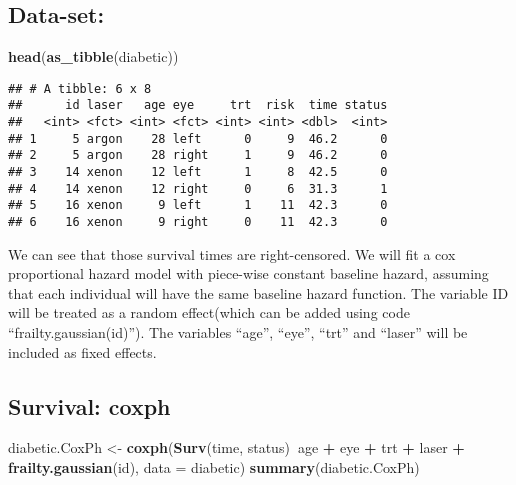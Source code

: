 \documentclass[]{article}
\newenvironment{Shaded}{\begin{snugshade}}{\end{snugshade}}
\newcommand{\DataTypeTok}[1]{\textcolor[rgb]{0.13,0.29,0.53}{#1}}
\newcommand{\KeywordTok}[1]{\textcolor[rgb]{0.13,0.29,0.53}{\textbf{#1}}}
\newcommand{\NormalTok}[1]{#1}
\newcommand{\OperatorTok}[1]{\textcolor[rgb]{0.81,0.36,0.00}{\textbf{#1}}}
\newcommand{\StringTok}[1]{\textcolor[rgb]{0.31,0.60,0.02}{#1}}
\begin{document}
\hypertarget{data-set}{%
\subsection{Data-set:}\label{data-set}}

\begin{Shaded}
\begin{Highlighting}[]
\KeywordTok{head}\NormalTok{(}\KeywordTok{as_tibble}\NormalTok{(diabetic))}
\end{Highlighting}
\end{Shaded}

\begin{verbatim}
## # A tibble: 6 x 8
##      id laser   age eye     trt  risk  time status
##   <int> <fct> <int> <fct> <int> <int> <dbl>  <int>
## 1     5 argon    28 left      0     9  46.2      0
## 2     5 argon    28 right     1     9  46.2      0
## 3    14 xenon    12 left      1     8  42.5      0
## 4    14 xenon    12 right     0     6  31.3      1
## 5    16 xenon     9 left      1    11  42.3      0
## 6    16 xenon     9 right     0    11  42.3      0
\end{verbatim}

We can see that those survival times are right-censored. We will fit a
cox proportional hazard model with piece-wise constant baseline hazard,
assuming that each individual will have the same baseline hazard
function. The variable ID will be treated as a random effect(which can
be added using code ``frailty.gaussian(id)''). The variables ``age'',
``eye'', ``trt'' and ``laser'' will be included as fixed effects.

\hypertarget{survival-coxph}{%
\subsection{Survival: coxph}\label{survival-coxph}}

\begin{Shaded}
\begin{Highlighting}[]
\NormalTok{diabetic.CoxPh <-}\StringTok{ }\KeywordTok{coxph}\NormalTok{(}\KeywordTok{Surv}\NormalTok{(time, status)}\OperatorTok{~}\NormalTok{age }\OperatorTok{+}\StringTok{ }\NormalTok{eye }\OperatorTok{+}\StringTok{ }\NormalTok{trt }\OperatorTok{+}\StringTok{ }\NormalTok{laser }\OperatorTok{+}\StringTok{ }\KeywordTok{frailty.gaussian}\NormalTok{(id), }\DataTypeTok{data =}\NormalTok{ diabetic)}
\KeywordTok{summary}\NormalTok{(diabetic.CoxPh)}
\end{Highlighting}
\end{Shaded}
\end{document}
